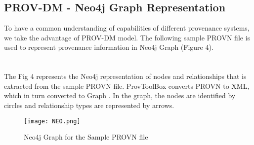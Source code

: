 \documentclass[6pt,,a4paper]{article}
\begin{document}
\subsection{\textbf{PROV-DM - Neo4j Graph Representation}}
To have a common understanding of capabilities of different provenance systems, we take the advantage of PROV-DM model. The following sample PROVN file is used to represent provenance information in Neo4j Graph (Figure 4).
\\
\\
\\
\newline
\newline
The Fig 4 represents the Neo4j representation of nodes and relationships that is extracted from the sample PROVN file. ProvToolBox converts PROVN to XML, which in turn converted to Graph . In the graph, the nodes are identified by circles and relationship types are represented by arrows. 
\\ 
\begin{figure}[h]
\begin{center}
            \texttt{[image: NEO.png]}
\end{center}
\centering
\caption{Neo4j Graph for the Sample PROVN file}
\end{figure} 
\end{document}
